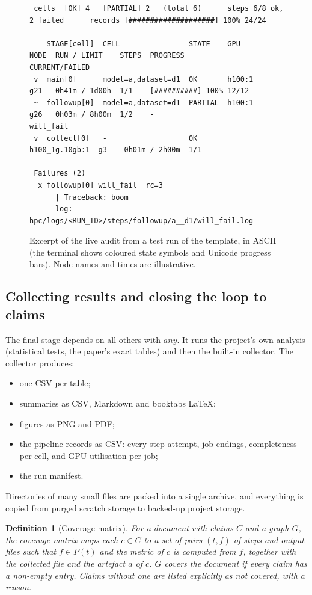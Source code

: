 \documentclass[pdflatex,sn-mathphys-num]{sn-jnl}
\theoremstyle{thmstyleone}%
\theoremstyle{thmstyletwo}%
\theoremstyle{thmstylethree}%
\newtheorem{definition}{Definition}%
\begin{document}
\begin{figure}[t]
\centering
\begin{lstlisting}
 cells  [OK] 4   [PARTIAL] 2   (total 6)      steps 6/8 ok, 2 failed      records [####################] 100% 24/24

    STAGE[cell]  CELL                STATE    GPU             NODE  RUN / LIMIT    STEPS  PROGRESS                CURRENT/FAILED
 v  main[0]      model=a,dataset=d1  OK       h100:1          g21   0h41m / 1d00h  1/1    [##########] 100% 12/12  -
 ~  followup[0]  model=a,dataset=d1  PARTIAL  h100:1          g26   0h03m / 8h00m  1/2    -                        will_fail
 v  collect[0]   -                   OK       h100_1g.10gb:1  g3    0h01m / 2h00m  1/1    -                        -
 Failures (2)
  x followup[0] will_fail  rc=3
      | Traceback: boom
      log: hpc/logs/<RUN_ID>/steps/followup/a__d1/will_fail.log
\end{lstlisting}
\caption{Excerpt of the live audit from a test run of the template, in ASCII
(the terminal shows coloured state symbols and Unicode progress bars). Node
names and times are illustrative.}
\label{fig:audit}
\end{figure}

\subsection{Collecting results and closing the loop to claims}\label{sec:collect}

The final stage depends on all others with $\mathit{any}$. It runs the
project's own analysis (statistical tests, the paper's exact tables) and then
the built-in collector. The collector produces:
\begin{itemize}[leftmargin=1.4em, itemsep=1pt]
\item one CSV per table;
\item summaries as CSV, Markdown and booktabs \LaTeX;
\item figures as PNG and PDF;
\item the pipeline records as CSV: every step attempt, job endings,
completeness per cell, and GPU utilisation per job;
\item the run manifest.
\end{itemize}
Directories of many small files are packed into a single archive, and
everything is copied from purged scratch storage to backed-up project storage.

\begin{definition}[Coverage matrix]\label{def:coverage}
For a document with claims $C$ and a graph $G$, the coverage matrix maps each
$c\in C$ to a set of pairs $(t,f)$ of steps and output files such that $f\in
P(t)$ and the metric of $c$ is computed from $f$, together with the collected
file and the artefact $a$ of $c$. $G$ \emph{covers} the document if every claim
has a non-empty entry. Claims without one are listed explicitly as \emph{not
covered}, with a reason.
\end{definition}
\end{document}
